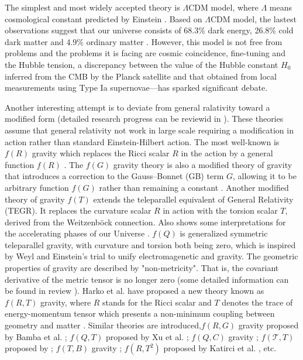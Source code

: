 \documentclass[a4paper,fleqn]{cas-sc}
\begin{document}
The simplest and most widely accepted theory is $\Lambda \text{CDM}$ model, where $\Lambda$ means cosmological constant predicted by Einstein \cite{Carroll_2001}.
Based on $\Lambda \text{CDM}$ model, the lastest observations suggest that our universe consists of 68.3\% dark energy, 26.8\% cold dark matter and 4.9\% ordinary matter \cite{2020Planck}. However, this model is not free from problems and the problems it is facing are cosmic coincidence, fine-tuning and the Hubble tension, a discrepancy between the value of the Hubble constant $H_0$ inferred from the CMB by the Planck satellite and that obtained from local measurements using Type Ia supernovae—has sparked significant debate. 

Another interesting attempt is to deviate from general ralativity toward a modified form (detailed research progress can be reviewid in \cite{Clifton_2012}). These theories assume that general relativity not work in large scale requiring a modification in action rather than standard Einstein-Hilbert action. The most well-known is $f(R)$ gravity which replaces the Ricci scalar $R$ in the action by a general function $f(R)$ \cite{1970MNRAS.150....1B}. The $f(G)$ gravity theory is also a modified theory of gravity that introduces a correction to the Gauss–Bonnet (GB) term $G$, allowing it to be arbitrary function $f(G)$ rather than remaining a constant \cite{NOJIRI20051,NOJIRI_2007}. Another modified theory of gravity $f(T)$ extends the teleparallel equivalent of General Relativity (TEGR). It replaces the curvature scalar $R$ in action with the torsion scalar $T$, derived from the Weitzenböck connection. Also shows some interpretations for the accelerating phases of our Universe \cite{Cai_2016,Bengochea_2009}. $f(Q)$ is generalized symmetric teleparallel gravity, with curvature and torsion both being zero, which is inspired by Weyl and Einstein's trial to unify electromagenetic and gravity. The geometric properties of gravity are described by "non-metricity". That is, the covariant derivative of the metric tensor is no longer zero (some detailed information can be found in review \cite{HEISENBERG20241}). Harko et al. have proposed a new theory known as $f (R, T )$ gravity, where $R$ stands for the Ricci scalar and $T$ denotes the trace of energy-momentum tensor which presents a non-minimum coupling between geometry and matter \cite{PhysRevD.84.024020}. Similar theories are introduced,$f(R,G)$ gravity proposed by Bamba et al. \cite{Bamba2009FinitetimeFS}; $f(Q,T)$ proposed by Xu et al. \cite{Xu_2019}; $f(Q,C)$ gravity \cite{De_2024}; $f(\mathcal{T},T)$ proposed by \cite{Harko_2014}; $f(T,B)$ gravity \cite{Bahamonde_2015,Bahamonde_2017}; $f(R,T^2)$ proposed by Katirci et al. \cite{Kat_rc__2014}, etc.
\end{document}
